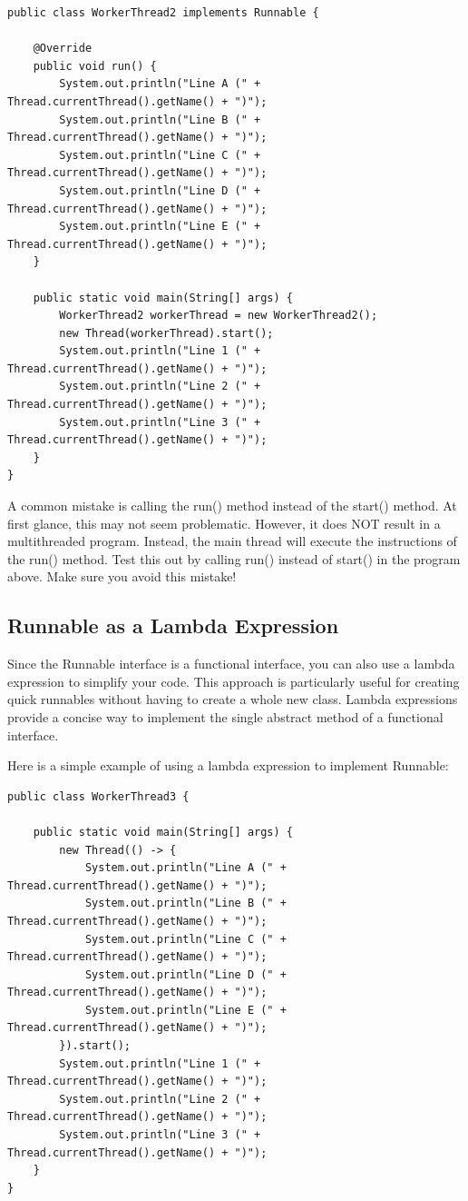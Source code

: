 \begin{lstlisting}
public class WorkerThread2 implements Runnable {

	@Override
	public void run() {
		System.out.println("Line A (" + Thread.currentThread().getName() + ")");
		System.out.println("Line B (" + Thread.currentThread().getName() + ")");
		System.out.println("Line C (" + Thread.currentThread().getName() + ")");
		System.out.println("Line D (" + Thread.currentThread().getName() + ")");
		System.out.println("Line E (" + Thread.currentThread().getName() + ")");
	}

	public static void main(String[] args) {
		WorkerThread2 workerThread = new WorkerThread2();
		new Thread(workerThread).start();
		System.out.println("Line 1 (" + Thread.currentThread().getName() + ")");
		System.out.println("Line 2 (" + Thread.currentThread().getName() + ")");
		System.out.println("Line 3 (" + Thread.currentThread().getName() + ")");
	}
}
\end{lstlisting}

A common mistake is calling the run() method instead of the start() method. At first glance, this may not seem problematic. However, it does NOT result in a multithreaded program. Instead, the main thread will execute the instructions of the run() method. Test this out by calling run() instead of start() in the program above. Make sure you avoid this mistake!

\subsection{Runnable as a Lambda Expression}

Since the Runnable interface is a functional interface, you can also use a lambda expression to simplify your code. This approach is particularly useful for creating quick runnables without having to create a whole new class. Lambda expressions provide a concise way to implement the single abstract method of a functional interface.

Here is a simple example of using a lambda expression to implement Runnable:

\begin{lstlisting}
public class WorkerThread3 {

	public static void main(String[] args) {
		new Thread(() -> {
			System.out.println("Line A (" + Thread.currentThread().getName() + ")");
			System.out.println("Line B (" + Thread.currentThread().getName() + ")");
			System.out.println("Line C (" + Thread.currentThread().getName() + ")");
			System.out.println("Line D (" + Thread.currentThread().getName() + ")");
			System.out.println("Line E (" + Thread.currentThread().getName() + ")");
		}).start();
		System.out.println("Line 1 (" + Thread.currentThread().getName() + ")");
		System.out.println("Line 2 (" + Thread.currentThread().getName() + ")");
		System.out.println("Line 3 (" + Thread.currentThread().getName() + ")");
	}
}
\end{lstlisting}

